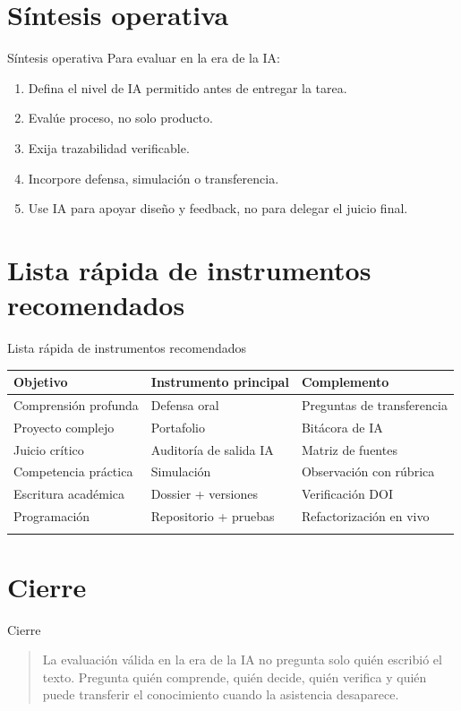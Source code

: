 \documentclass[
  ignorenonframetext,
  aspectratio=169,
  spanish,
]{beamer}
\newcounter{none} %
\providecommand{\tightlist}{%
  \setlength{\itemsep}{0pt}\setlength{\parskip}{0pt}}
\begin{document}
\section{Síntesis operativa}\label{suxedntesis-operativa}

\begin{frame}{Síntesis operativa}
Para evaluar en la era de la IA:

\begin{enumerate}
\tightlist
\item
  Defina el nivel de IA permitido antes de entregar la tarea.
\item
  Evalúe proceso, no solo producto.
\item
  Exija trazabilidad verificable.
\item
  Incorpore defensa, simulación o transferencia.
\item
  Use IA para apoyar diseño y feedback, no para delegar el juicio final.
\end{enumerate}
\end{frame}

\section{Lista rápida de instrumentos
recomendados}\label{lista-ruxe1pida-de-instrumentos-recomendados}

\begin{frame}{Lista rápida de instrumentos recomendados}
{\def\LTcaptype{none} %
\begin{longtable}[]{@{}lll@{}}
\toprule\noalign{}
Objetivo & Instrumento principal & Complemento \\
\midrule\noalign{}
\endhead
Comprensión profunda & Defensa oral & Preguntas de transferencia \\
Proyecto complejo & Portafolio & Bitácora de IA \\
Juicio crítico & Auditoría de salida IA & Matriz de fuentes \\
Competencia práctica & Simulación & Observación con rúbrica \\
Escritura académica & Dossier + versiones & Verificación DOI \\
Programación & Repositorio + pruebas & Refactorización en vivo \\
\bottomrule\noalign{}
\end{longtable}
}
\end{frame}

\section{Cierre}\label{cierre}

\begin{frame}{Cierre}
\begin{quote}
La evaluación válida en la era de la IA no pregunta solo quién escribió
el texto. Pregunta quién comprende, quién decide, quién verifica y quién
puede transferir el conocimiento cuando la asistencia desaparece.
\end{quote}
\end{frame}
\end{document}
